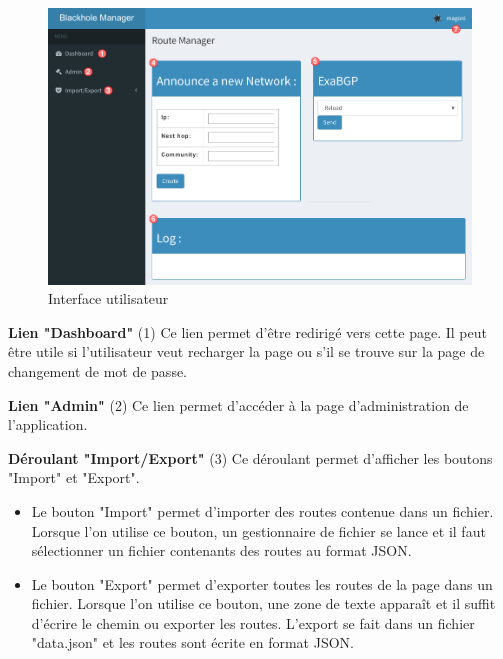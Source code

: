 \begin{figure}[H]
    \includegraphics[width=\textwidth]{medias/ui_upper_marked.png}
    \caption{Interface utilisateur}
    \label{fig:ui_upper}
\end{figure}

\newpage
\textbf{Lien "Dashboard"} (1)\newline
Ce lien permet d'être redirigé vers cette page. Il peut être utile si l'utilisateur veut recharger la page ou s'il se trouve sur la page de changement de mot de passe.\newline

\textbf{Lien "Admin"} (2)\newline
Ce lien permet d'accéder à la page d'administration de l'application.\newline

\textbf{Déroulant "Import/Export"} (3)\newline
Ce déroulant permet d'afficher les boutons "Import" et "Export". 
\begin{itemize}
    \item Le bouton "Import" permet d'importer des routes contenue dans un fichier. Lorsque l'on utilise ce bouton, un gestionnaire de fichier se lance et il faut sélectionner un fichier contenants des routes au format JSON.
    \item Le bouton "Export" permet d'exporter toutes les routes de la page dans un fichier. Lorsque l'on utilise ce bouton, une zone de texte apparaît et il suffit d'écrire le chemin ou exporter les routes. L'export se fait dans un fichier "data.json" et les routes sont écrite en format JSON.\newline
\end{itemize}

